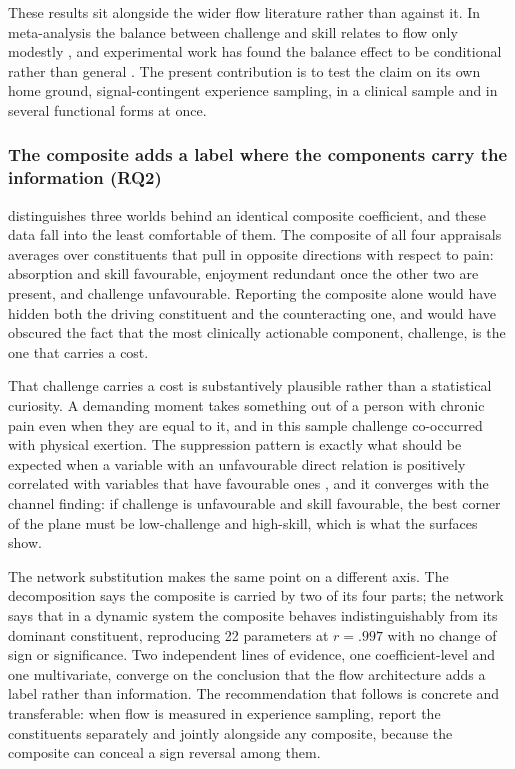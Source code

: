 \documentclass[11pt,a4paper]{article}
\begin{document}
These results sit alongside the wider flow literature rather than against it. In meta-analysis the
balance between challenge and skill relates to flow only modestly \citep{fong2015challenge}, and
experimental work has found the balance effect to be conditional rather than general
\citep{engeser2008flow}. The present contribution is to test the claim on its own home ground,
signal-contingent experience sampling, in a clinical sample and in several functional forms at
once.

\subsubsection{The composite adds a label where the components carry the information (RQ2)}
\citet{vanderweele2022constructed} distinguishes three worlds behind an identical composite
coefficient, and these data fall into the least comfortable of them. The composite of all four
appraisals averages over constituents that pull in opposite directions with respect to pain:
absorption and skill favourable, enjoyment redundant once the other two are present, and challenge
unfavourable. Reporting the composite alone would have hidden both the driving constituent and the
counteracting one, and would have obscured the fact that the most clinically actionable component,
challenge, is the one that carries a cost.

That challenge carries a cost is substantively plausible rather than a statistical curiosity. A
demanding moment takes something out of a person with chronic pain even when they are equal to it,
and in this sample challenge co-occurred with physical exertion. The suppression pattern is exactly
what should be expected when a variable with an unfavourable direct relation is positively
correlated with variables that have favourable ones \citep{mackinnon2000equivalence}, and it
converges with the channel finding: if challenge is unfavourable and skill favourable, the best
corner of the plane must be low-challenge and high-skill, which is what the surfaces show.

The network substitution makes the same point on a different axis. The decomposition says the
composite is carried by two of its four parts; the network says that in a dynamic system the
composite behaves indistinguishably from its dominant constituent, reproducing 22 parameters at
$r=.997$ with no change of sign or significance. Two independent lines of evidence, one
coefficient-level and one multivariate, converge on the conclusion that the flow architecture adds
a label rather than information. The recommendation that follows is concrete and transferable: when
flow is measured in experience sampling, report the constituents separately and jointly alongside
any composite, because the composite can conceal a sign reversal among them.
\end{document}
